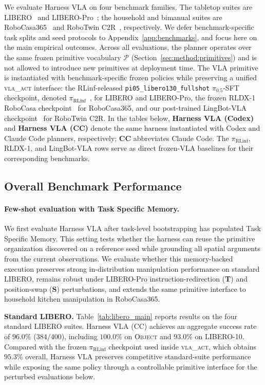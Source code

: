 \documentclass[11pt]{article}
\newcommand{\piRLinf}{\pi_{\mathrm{RLinf}}}
\begin{document}
We evaluate Harness VLA on four benchmark families. The tabletop suites are LIBERO~\citep{liu2023libero} and LIBERO-Pro~\citep{Lagrange1788}; the household and bimanual suites are RoboCasa365~\citep{robocasa365} and RoboTwin C2R~\citep{mu2025robotwin}, respectively. We defer benchmark-specific task splits and seed protocols to Appendix~\ref{app:benchmarks}, and focus here on the main empirical outcomes. Across all evaluations, the planner operates over the same frozen primitive vocabulary $\mathcal{P}$ (Section~\ref{sec:method:primitives}) and is not allowed to introduce new primitives at deployment time. The VLA primitive is instantiated with benchmark-specific frozen policies while preserving a unified \textsc{vla\_act} interface: the RLinf-released \texttt{pi05\_libero130\_fullshot} $\pi_{0.5}$-SFT checkpoint, denoted $\piRLinf$~\citep{yu2025rlinf}, for LIBERO and LIBERO-Pro, the frozen RLDX-1 RoboCasa checkpoint~\citep{kim2026rldx} for RoboCasa365, and our post-trained LingBot-VLA checkpoint~\citep{wu2026pragmatic} for RoboTwin C2R. In the tables below, \textbf{Harness VLA (Codex)} and \textbf{Harness VLA (CC)} denote the same harness instantiated with Codex and Claude Code planners, respectively; \textbf{CC} abbreviates Claude Code. The $\piRLinf$, RLDX-1, and LingBot-VLA rows serve as direct frozen-VLA baselines for their corresponding benchmarks.

\subsection{Overall Benchmark Performance}
\label{sec:exp:overall}

\paragraph{Few-shot evaluation with Task Specific Memory.}
We first evaluate Harness VLA after task-level bootstrapping has populated Task Specific Memory. This setting tests whether the harness can reuse the primitive organization discovered on a reference seed while grounding all spatial arguments from the current observations. We evaluate whether this memory-backed execution preserves strong in-distribution manipulation performance on standard LIBERO, remains robust under LIBERO-Pro instruction-redirection (\textbf{T}) and position-swap (\textbf{S}) perturbations, and extends the same primitive interface to household kitchen manipulation in RoboCasa365.

\textbf{Standard LIBERO.} Table~\ref{tab:libero_main} reports results on the four standard LIBERO suites. Harness VLA (CC) achieves an aggregate success rate of $\mathbf{96.0\%}$ ($384/400$), including $100.0\%$ on \textsc{Object} and $93.0\%$ on \textsc{LIBERO-10}. Compared with the frozen $\piRLinf$ checkpoint used inside \textsc{vla\_act}, which obtains $95.3\%$ overall, Harness VLA preserves competitive standard-suite performance while exposing the same policy through a controllable primitive interface for the perturbed evaluations below.
\end{document}

